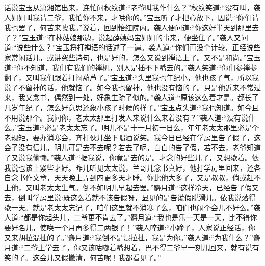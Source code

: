 


\begin{parag}
    话说宝玉从潇湘馆出来，连忙问秋纹道:“老爷叫我作什么？”秋纹笑道:“没有叫，袭人姐姐叫我请二爷，我怕你不来，才哄你的。”宝玉听了才把心放下，因说:“你们请我也罢了，何苦来唬我。”说着，回到怡红院内。袭人便问道:“你这好半天到那里去了？”宝玉道:“在林姑娘那边，说起薛姨妈宝姐姐的事来，便坐住了。”袭人又问道:“说些什么？”宝玉将打禅语的话述了一遍。袭人道:“你们再没个计较，正经说些家常闲话儿，或讲究些诗句，也是好的，怎么又说到禅语上了。又不是和尚。”宝玉道:“你不知道，我们有我们的禅机，别人是插不下嘴去的。”袭人笑道:“你们参禅参翻了，又叫我们跟着打闷葫芦了。”宝玉道:“头里我也年纪小，他也孩子气，所以我说了不留神的话，他就恼了。如今我也留神，他也没有恼的了。只是他近来不常过来，我又念书，偶然到一处，好象生疏了似的。”袭人道:“原该这么着才是。都长了几岁年纪了，怎么好意思还象小孩子时候的样子。”宝玉点头道:“我也知道。如今且不用说那个。我问你，老太太那里打发人来说什么来着没有？”袭人道:“没有说什么。”宝玉道:“必是老太太忘了。明儿不是十一月初一日么，年年老太太那里必是个老规矩，要办消寒会，齐打伙儿坐下喝酒说笑。我今日已经在学房里告了假了，这会子没有信儿，明儿可是去不去呢？若去了呢，白白的告了假，若不去，老爷知道了又说我偷懒。”袭人道:“据我说，你竟是去的是。才念的好些儿了，又想歇着。依我说也该上紧些才好。昨儿听见太太说，兰哥儿念书真好，他打学房里回来，还各自念书作文章，天天晚上弄到四更多天才睡。你比他大多了，又是叔叔，倘或赶不上他，又叫老太太生气。倒不如明儿早起去罢。”麝月道:“这样冷天，已经告了假又去，倒叫学房里说:既这么着就不该告假呀，显见的是告谎假脱滑儿。依我说落得歇一天。就是老太太忘记了，咱们这里就不消寒了么，咱们也闹个会儿不好么。”袭人道:“都是你起头儿，二爷更不肯去了。”麝月道:“我也是乐一天是一天，比不得你要好名儿，使唤一个月再多得二两银子！”袭人啐道:“小蹄子，人家说正经话，你又来胡拉混扯的了。”麝月道:“我倒不是混拉扯，我是为你。”袭人道:“为我什么？”麝月道:“二爷上学去了，你又该咕嘟着嘴想着，巴不得二爷早一刻儿回来，就有说有笑的了。这会儿又假撇清，何苦呢！我都看见了。”
\end{parag}


